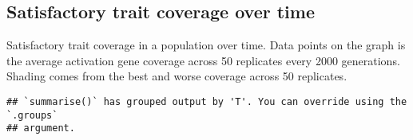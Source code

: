 \documentclass[]{book}
\newenvironment{Shaded}{\begin{snugshade}}{\end{snugshade}}
\newcommand{\DataTypeTok}[1]{\textcolor[rgb]{0.13,0.29,0.53}{#1}}
\newcommand{\KeywordTok}[1]{\textcolor[rgb]{0.13,0.29,0.53}{\textbf{#1}}}
\newcommand{\NormalTok}[1]{#1}
\newcommand{\OperatorTok}[1]{\textcolor[rgb]{0.81,0.36,0.00}{\textbf{#1}}}
\newcommand{\StringTok}[1]{\textcolor[rgb]{0.31,0.60,0.02}{#1}}
\begin{document}
\hypertarget{satisfactory-trait-coverage-over-time}{%
\subsection{Satisfactory trait coverage over time}\label{satisfactory-trait-coverage-over-time}}

Satisfactory trait coverage in a population over time.
Data points on the graph is the average activation gene coverage across 50 replicates every 2000 generations.
Shading comes from the best and worse coverage across 50 replicates.

\begin{Shaded}
\end{Shaded}

\begin{verbatim}
## `summarise()` has grouped output by 'T'. You can override using the `.groups`
## argument.
\end{verbatim}
\end{document}
